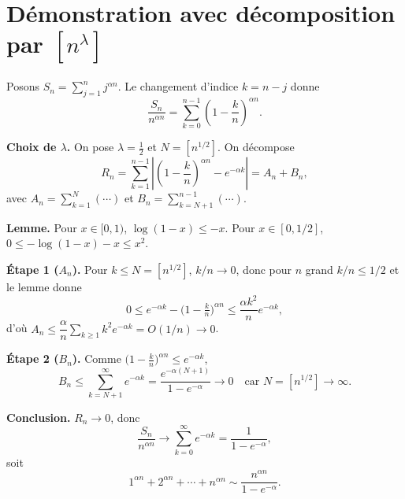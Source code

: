 \documentclass[11pt]{article}
\begin{document}
\section*{Démonstration avec décomposition par $[n^\lambda]$}

Posons $S_n=\sum_{j=1}^n j^{\alpha n}$. Le changement d'indice $k=n-j$ donne
\[
\frac{S_n}{n^{\alpha n}}=\sum_{k=0}^{n-1}\left(1-\frac{k}{n}\right)^{\alpha n}.
\]

\textbf{Choix de $\lambda$.} On pose $\lambda=\tfrac12$ et $N=[n^{1/2}]$. On décompose
\[
R_n=\sum_{k=1}^{n-1}\left|\left(1-\frac{k}{n}\right)^{\alpha n}-e^{-\alpha k}\right|
= A_n+B_n,
\]
avec $A_n=\sum_{k=1}^{N}(\cdots)$ et $B_n=\sum_{k=N+1}^{n-1}(\cdots)$.

\textbf{Lemme.} Pour $x\in[0,1)$, $\log(1-x)\le -x$. Pour $x\in[0,1/2]$,
$0\le -\log(1-x)-x\le x^2$.

\textbf{Étape 1 ($A_n$).} Pour $k\le N=[n^{1/2}]$, $k/n\to 0$, donc pour $n$ grand
$k/n\le 1/2$ et le lemme donne
\[
0\le e^{-\alpha k}-\Big(1-\tfrac{k}{n}\Big)^{\alpha n}\le \frac{\alpha k^2}{n}e^{-\alpha k},
\]
d'où $A_n\le \dfrac{\alpha}{n}\sum_{k\ge1}k^2e^{-\alpha k}=O(1/n)\to0$.

\textbf{Étape 2 ($B_n$).} Comme $\big(1-\tfrac kn\big)^{\alpha n}\le e^{-\alpha k}$,
\[
B_n\le \sum_{k=N+1}^\infty e^{-\alpha k}=\frac{e^{-\alpha(N+1)}}{1-e^{-\alpha}}\longrightarrow 0
\quad\text{car } N=[n^{1/2}]\to\infty.
\]

\textbf{Conclusion.} $R_n\to0$, donc
\[
\frac{S_n}{n^{\alpha n}}\longrightarrow \sum_{k=0}^\infty e^{-\alpha k}=\frac{1}{1-e^{-\alpha}},
\]
soit
\[
\boxed{1^{\alpha n}+2^{\alpha n}+\cdots+n^{\alpha n}\sim\frac{n^{\alpha n}}{1-e^{-\alpha}}.}
\]
\end{document}
